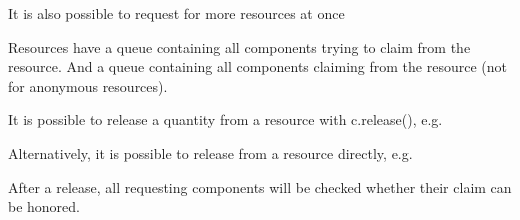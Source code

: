 \documentclass[letterpaper,10pt,english]{sphinxmanual}
\begin{document}
It is also possible to request for more resources at once

%
\begin{sphinxVerbatim}[commandchars=\\\{\}]
   
\end{sphinxVerbatim}

Resources have a queue  containing all components trying to claim from the resource.
And a queue  containing all components claiming from the resource
(not for anonymous resources).

It is possible to release a quantity from a resource with c.release(), e.g.

%
\begin{sphinxVerbatim}[commandchars=\\\{\}]
  
  
\end{sphinxVerbatim}

Alternatively, it is possible to release from a resource directly, e.g.

%
\begin{sphinxVerbatim}[commandchars=\\\{\}]
  
  
\end{sphinxVerbatim}

After a release, all requesting components will be checked whether their claim can be honored.
\end{document}

